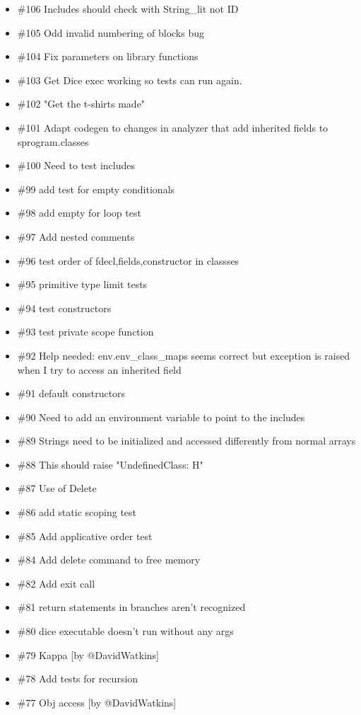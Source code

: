 \begin{homeworkProblem}
\begin{itemize}
		\item \#106 Includes should check with String\_lit not ID
		\item \#105 Odd invalid numbering of blocks bug
		\item \#104 Fix parameters on library functions
		\item \#103 Get Dice exec working so tests can run again.
		\item \#102 "Get the t-shirts made"
		\item \#101 Adapt codegen to changes in analyzer that add inherited fields to sprogram.classes
		\item \#100 Need to test includes
		\item \#99 add test for empty conditionals
		\item \#98 add empty for loop test
		\item \#97 Add nested comments
		\item \#96 test order of fdecl,fields,constructor in classses
		\item \#95 primitive type limit tests
		\item \#94 test constructors
		\item \#93 test private scope function
		\item \#92 Help needed: env.env\_class\_maps seems correct but exception is raised when I try to access an inherited field
		\item \#91 default constructors
		\item \#90 Need to add an environment variable to point to the includes
		\item \#89 Strings need to be initialized and accessed differently from normal arrays
		\item \#88 This should raise "UndefinedClass: H"
		\item \#87 Use of Delete
		\item \#86 add static scoping test
		\item \#85 Add applicative order test
		\item \#84 Add delete command to free memory
		\item \#82 Add exit call
		\item \#81 return statements in branches aren't recognized
		\item \#80 dice executable doesn't run without any args
		\item \#79 Kappa [by @DavidWatkins]
		\item \#78 Add tests for recursion
		\item \#77 Obj access [by @DavidWatkins]

\end{itemize}
\end{homeworkProblem}
